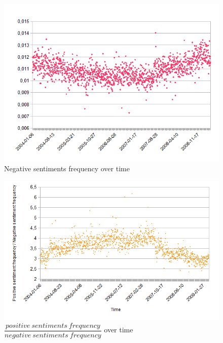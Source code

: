 \documentclass{beamer}
\begin{document}
	\begin{frame}
		\begin{figure}
			\caption{Negative sentiments frequency over time}
			\includegraphics[scale=.5]{plots/time/neg.png}
		\end{figure}
	\end{frame}

	\begin{frame}
		\begin{figure}
			\caption{$\dfrac{positive\ sentiments\ frequency}{negative\ sentiments\ frequency}$ over time}
			\includegraphics[scale=.5]{plots/time/posdivneg.png}
		\end{figure}
	\end{frame}
\end{document}
